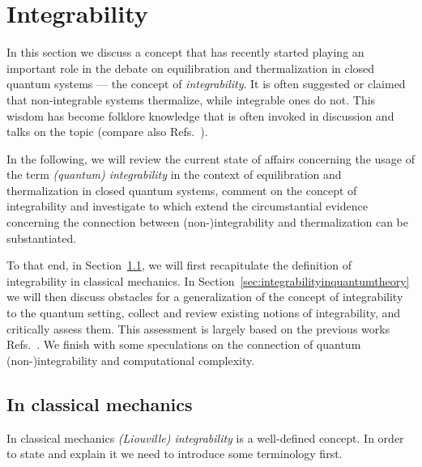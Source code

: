 \documentclass[a4paper,12pt,listof=totoc,index=totoc,bibliography=totoc,headsepline=false,headings=normal,BCOR16.153846mm,DIV12,headinclude,twoside,cleardoublepage=empty,numbers=noenddot,final]{scrreprt}
\theoremstyle{mystyle}
\numberwithin{equation}{section}
\numberwithin{figure}{section}
\numberwithin{lemma}{section}
\numberwithin{theorem}{section}
\numberwithin{corollary}{section}
\numberwithin{definition}{section}
\numberwithin{conjecture}{section}
\numberwithin{observation}{section}
\newcommand{\+}{\mkern2mu}
\DeclareMathOperator{\1}{\mathds{1}}
\begin{document}
\section{Integrability}
\label{sec:integrability}
%
In this section we discuss a concept that has recently started playing an important role in the debate on equilibration and thermalization in closed quantum systems --- the concept of \emph{integrability}.
It is often suggested or claimed that non-integrable systems thermalize, while integrable ones do not.
This wisdom has become folklore knowledge that is often invoked in discussion and talks on the topic (compare also Refs.~\cite{Rigol08,Rigol09,Rigol11,Biroli09,Znidaric09,1103.0787v1,1102.0528v1,Polkovnikov11,1108.0928v1,Neuenhahn10,Larson13,1201.0186v1,Beugeling2013,1112.3424v1.pd,Beugeling2013}).

In the following, we will review the current state of affairs concerning the usage of the term \emph{(quantum) integrability} in the context of equilibration and thermalization in closed quantum systems, comment on the concept of integrability and investigate to which extend the circumstantial evidence concerning the connection between \mbox{\mbox{(non-)}}integrability and thermalization can be substantiated.

To that end, in Section~\ref{sec:integrabilityinclassicalmechanics}, we will first recapitulate the definition of integrability in classical mechanics.
In Section~\ref{sec:integrabilityinquantumtheory} we will then discuss obstacles for a generalization of the concept of integrability to the quantum setting, collect and review existing notions of integrability, and critically assess them.
This assessment is largely based on the previous works Refs.~\cite{Weigert1992,1012.3587v1,PhysRevLett.10-6}.
We finish with some speculations on the connection of quantum \mbox{(non-)}integrability and computational complexity.


\subsection{In classical mechanics}
\label{sec:integrabilityinclassicalmechanics}
%
In classical mechanics \cite{Arnold78} \emph{(Liouville) integrability} is a well-defined concept.
In order to state and explain it we need to introduce some terminology first.
\end{document}
